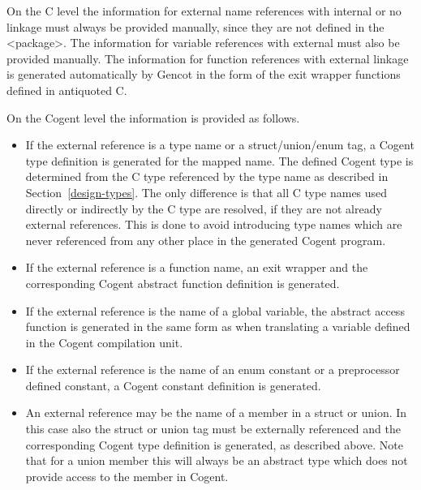 On the C level the information for external name references with internal or no linkage must always be provided manually,
since they are not defined in the <package>. The information for variable references with external must also be provided
manually. The information for function references with external linkage is generated automatically by Gencot in the 
form of the exit wrapper functions defined in antiquoted C. 

On the Cogent level the information is provided as follows.
\begin{itemize}
\item If the external reference is a type name or a struct/union/enum tag, a Cogent type definition is generated for the mapped name.
The defined Cogent type is determined
from the C type referenced by the type name as described in Section~\ref{design-types}. The only difference is that all C type
names used directly or indirectly by the C type are resolved, if they are not already external references. This is done to avoid 
introducing type names which are never referenced from any other place in the generated Cogent program. 
\item If the external reference is a function name, an exit wrapper and the corresponding Cogent abstract function 
definition is generated.
\item If the external reference is the name of a global variable, the abstract access function is generated in the same 
form as when translating a variable defined in the Cogent compilation unit.
\item If the external reference is the name of an enum constant or a preprocessor defined constant, a Cogent constant definition 
is generated.
\item An external reference may be the name of a member in a struct or union. In this case also the struct or union tag must
be externally referenced and the corresponding Cogent type definition is generated, as described above. Note that for a union
member this will always be an abstract type which does not provide access to the member in Cogent.
\end{itemize}
